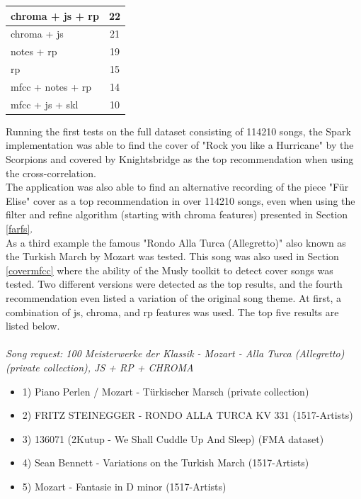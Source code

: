 \begin{table}[H]
\begin{minipage}{0.5\textwidth}
\begin{center}
\begin{tabular}{|l||c|}
				\hline
				chroma + js + rp & 22\\
				\hline
				chroma + js & 21\\
				\hline
				notes + rp & 19\\
				\hline
				rp & 15\\
				\hline
				mfcc + notes + rp & 14\\
				\hline
				mfcc + js + skl & 10\\
				\hline
			\end{tabular}
		\end{center}
	\end{minipage}
\end{table}

\noindent Running the first tests on the full dataset consisting of 114210 songs, the Spark implementation was able to find the cover of "Rock you like a Hurricane" by the Scorpions and covered by Knightsbridge as the top recommendation when using the cross-correlation.\\
\noindent The application was also able to find an alternative recording of the piece "Für Elise" cover as a top recommendation in over 114210 songs, even when using the filter and refine algorithm (starting with chroma features) presented in Section \ref{farfs}.\\
\noindent As a third example the famous "Rondo Alla Turca (Allegretto)" also known as the Turkish March by Mozart was tested. This song was also used in Section \ref{covermfcc} where the ability of the Musly toolkit to detect cover songs was tested. \noindent Two different versions were detected as the top results, and the fourth recommendation even listed a variation of the original song theme. 
At first, a combination of js, chroma, and rp features was used. The top five results are listed below.\\
\ \\
\textit{\noindent Song request: 100 Meisterwerke der Klassik - Mozart - Alla Turca (Allegretto) (private collection), JS + RP + CHROMA}

\begin{itemize}
	\setlength\itemsep{-0.5em}
	\item 1) Piano Perlen / Mozart - Türkischer Marsch (private collection)
	\item 2) FRITZ STEINEGGER - RONDO ALLA TURCA KV 331 (1517-Artists)
	\item 3) 136071 (2Kutup - We Shall Cuddle Up And Sleep) (FMA dataset)
	\item 4) Sean Bennett - Variations on the Turkish March (1517-Artists)
	\item 5) Mozart - Fantasie in D minor (1517-Artists)
\end{itemize}

